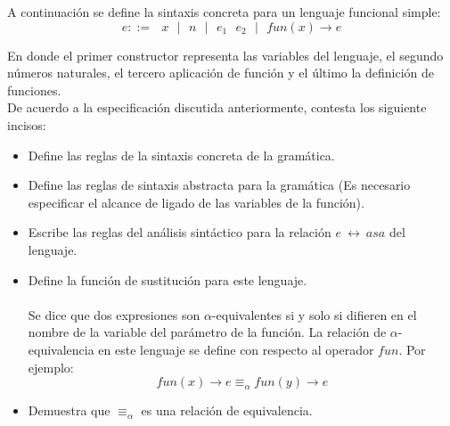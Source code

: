    \begin{exercise}
        A continuación se define la sintaxis concreta para un lenguaje funcional simple:
        \[ e ::=  \text{ $x$ } \text{$|$} \text{ $n$  }\text{$|$} \text{ } e_1 \text{ } e_2 \text{ } \text{$|$} \text{ } fun(x) \rightarrow e \]

    En donde el primer constructor representa las variables del lenguaje, el segundo números naturales,
    el tercero aplicación de función y el último la definición de funciones.\\

    De acuerdo a la especificación discutida anteriormente, contesta los siguiente incisos: \\
    \begin{itemize}
        \item Define las reglas de la sintaxis concreta de la gramática.
        \item Define las reglas de sintaxis abstracta para la gramática (Es necesario especificar el alcance de ligado de las variables de la función).
        \item Escribe las reglas del análisis sintáctico  para la relación $e \ \longleftrightarrow\ asa$ del lenguaje.
        \item Define la función de sustitución para este lenguaje. \\\\
        Se dice que dos expresiones son $\alpha$-equivalentes si y solo si difieren en el nombre de la variable del parámetro de la función. La relación de $\alpha$-equivalencia en este lenguaje se define con respecto al operador $fun$. Por ejemplo:
              \[ fun(x) \rightarrow e \equiv_\alpha fun(y) \rightarrow e \]
             \item Demuestra que $\equiv_\alpha$ es una relación de equivalencia.
    \end{itemize}

   \end{exercise}
    